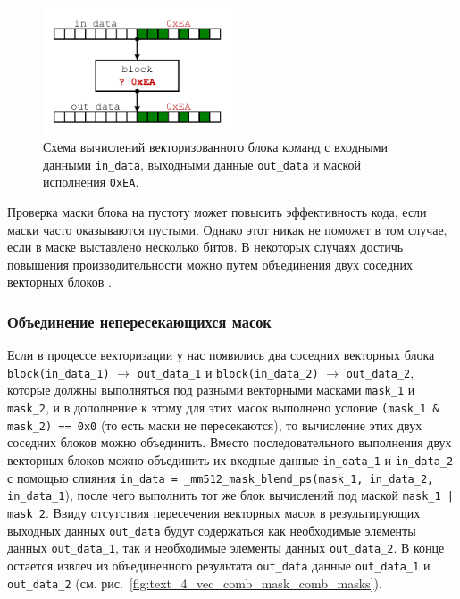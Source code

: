 \begin{figure}[ht]
\centering
\includegraphics[width=0.5\textwidth]{./fig/vec_block_under_mask.pdf}
\singlespacing
{}\caption{Схема вычислений векторизованного блока команд с входными данными \texttt{in\_data}, выходными данные \texttt{out\_data} и маской исполнения \texttt{0xEA}.}
\label{fig:text_4_vec_comb_mask_vec_block}
\end{figure}

Проверка маски блока на пустоту может повысить эффективность кода, если маски часто оказываются пустыми.
Однако этот никак не поможет в том случае, если в маске выставлено несколько битов.
В некоторых случаях достичь повышения производительности можно путем объединения двух соседних векторных блоков \cite{Rybakov2024VecComb}.

\subsubsection{Объединение непересекающихся масок}

Если в процессе векторизации у нас появились два соседних векторных блока \texttt{block(in\_data\_1)} $\rightarrow$ \texttt{out\_data\_1} и \texttt{block(in\_data\_2)} $\rightarrow$ \texttt{out\_data\_2}, которые должны выполняться под разными векторными масками \texttt{mask\_1} и \texttt{mask\_2}, и в дополнение к этому для этих масок выполнено условие \texttt{(mask\_1 \& mask\_2) == 0x0} (то есть маски не пересекаются), то вычисление этих двух соседних блоков можно объединить.
Вместо последовательного выполнения двух векторных блоков можно объединить их входные данные \texttt{in\_data\_1} и \texttt{in\_data\_2} с помощью слияния \texttt{in\_data = \_mm512\_mask\_blend\_ps(mask\_1, in\_data\_2, in\_data\_1}), после чего выполнить тот же блок вычислений под маской \texttt{mask\_1 | mask\_2}.
Ввиду отсутствия пересечения векторных масок в результирующих выходных данных \texttt{out\_data} будут содержаться как необходимые элементы данных \texttt{out\_data\_1}, так и необходимые элементы данных \texttt{out\_data\_2}.
В конце остается извлеч из объединенного результата \texttt{out\_data} данные \texttt{out\_data\_1} и \texttt{out\_data\_2} (см. рис.~\ref{fig:text_4_vec_comb_mask_comb_masks}).

